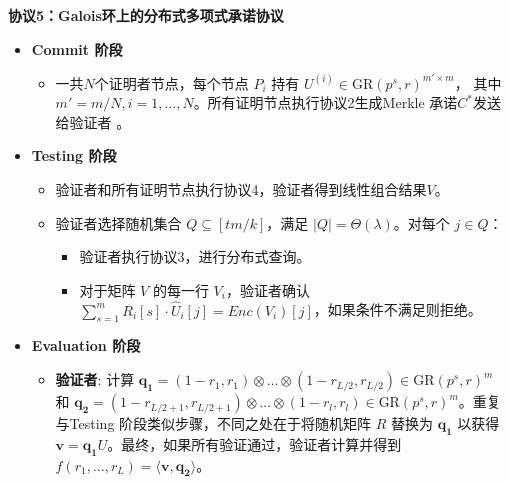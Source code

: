 \documentclass{article}
\begin{document}
\begin{tcolorbox}[
  width=\textwidth,
  colframe=black,
  colback=white,
  sharp corners,
  boxsep=2pt,
  left=2pt,right=2pt,top=3pt,bottom=3pt
]

\textbf{协议5：Galois环上的分布式多项式承诺协议}

\begin{itemize}
  \item \textbf{Commit 阶段}
  \begin{itemize}
    \item 一共\( N \)个证明者节点，每个节点 \( P_i \) 持有 
    \( {U}^{(i)} \in \mathrm{GR}(p^s, r)^{m'\times m} \)，
    其中 \( m' = m/N ,i=1,\ldots,N\)。所有证明节点执行协议2生成Merkle 承诺\(C^{*}\)发送给验证者 。
  \end{itemize}
  
  \item \textbf{Testing 阶段}
  \begin{itemize}
    \item 验证者和所有证明节点执行协议4，验证者得到线性组合结果\(V\)。
    
    \item 验证者选择随机集合  \( Q \subseteq [tm/k] \)，满足 \( |Q| = \Theta(\lambda) \)。对每个 \( j \in Q \)：
    \begin{itemize}
      \item 验证者执行协议3，进行分布式查询。 
      \item 对于矩阵 \( V \) 的每一行 \( V_i \)，验证者确认 \( \sum_{s=1}^{m} R_i[s] \cdot \hat{U}_i[j] = Enc(V_i)[j] \)，如果条件不满足则拒绝。
    \end{itemize}
  \end{itemize}
  
  \item \textbf{Evaluation 阶段}
  \begin{itemize}
    \item \textbf{验证者}: 计算 \( \mathbf{q_1} = (1-r_1, r_1) \otimes \dots \otimes (1-r_{L/2}, r_{L/2}) \in \text{GR}(p^s, r)^m \) 和 \( \mathbf{q_2} = (1-r_{L/2+1}, r_{L/2+1}) \otimes \dots \otimes (1-r_l, r_l) \in \text{GR}(p^s, r)^m \)。重复与Testing 阶段类似步骤，不同之处在于将随机矩阵 \( R \) 替换为 \( \mathbf{q_1} \) 以获得 \( \mathbf{v} =\mathbf{q_1}U\)。最终，如果所有验证通过，验证者计算并得到 \( f(r_1, \dots, r_L) = \langle\mathbf{v}, \mathbf{q_2}\rangle \)。
  \end{itemize}

\end{itemize}
\end{tcolorbox}
\end{document}
